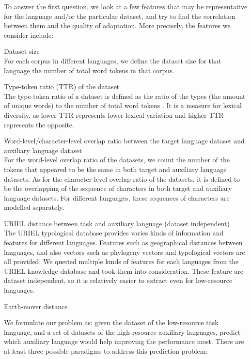 \documentclass[11pt,a4paper,usenames,dvipsnames]{article}
\begin{document}
To answer the first question, we look at a few features that may be representative for the language and/or the particular dataset, and try to find the correlation between them and the quality of adaptation. More precisely, the features we consider include:

\begin{enumerate}
\item Dataset size\\
For each corpus in different languages, we define the dataset size for that language the number of total word tokens in that corpus.
\item Type-token ratio (TTR) of the dataset\\
The type-token ratio of a dataset is defined as the ratio of the types (the amount of unique words) to the number of total word tokens \cite{richards87}. It is a measure for lexical diversity, as lower TTR represents lower lexical variation and higher TTR represents the opposite.
\item Word-level/character-level overlap {\color{red}ratio} between the target language dataset and auxiliary language dataset\\
For the word-level overlap ratio of the datasets, we count the number of the tokens that appeared to be the same in both target and auxiliary language datasets. As for the character-level overlap ratio of the datasets, it is defined to be the overlapping of the sequence of characters in both target and auxiliary language datasets. For different languages, these sequences of characters are modelled separately.
\item URIEL distance between task and auxiliary language (dataset independent) \\
The URIEL typological database \cite{littell17} provides varies kinds of information and features for different languages. Features such as geographical distances between languages, and also vectors such as phylogeny vectors and typological vectors are all provided. We queried multiple kinds of features for each languages from the URIEL knowledge database and took them into consideration. These feature are dataset independent, so it is relatively easier to extract even for low-resource languages.

{\color{blue}\item Earth-mover distance}
\end{enumerate}

\noindent We formulate our problem as: given the dataset of the low-resource task language, and a set of datasets of the high-resource auxiliary languages, predict which auxiliary language would help improving the performance most. There are at least three possible paradigms to address this prediction problem:
\end{document}
